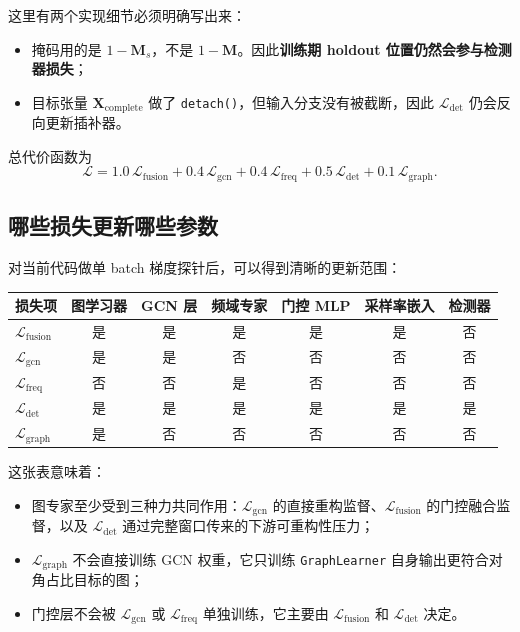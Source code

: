 \documentclass[UTF8]{ctexart}
\begin{document}
这里有两个实现细节必须明确写出来：
\begin{itemize}
    \item 掩码用的是 \(1-\bm{M}_{s}\)，不是 \(1-\bm{M}\)。因此\textbf{训练期 holdout 位置仍然会参与检测器损失}；
    \item 目标张量 \(\bm{X}_{\text{complete}}\) 做了 \texttt{detach()}，但输入分支没有被截断，因此 \(\mathcal{L}_{\text{det}}\) 仍会反向更新插补器。
\end{itemize}

总代价函数为
\begin{equation}
    \mathcal{L}
    =
    1.0\,\mathcal{L}_{\text{fusion}}
    + 0.4\,\mathcal{L}_{\text{gcn}}
    + 0.4\,\mathcal{L}_{\text{freq}}
    + 0.5\,\mathcal{L}_{\text{det}}
    + 0.1\,\mathcal{L}_{\text{graph}}.
\end{equation}

\subsection{哪些损失更新哪些参数}

对当前代码做单 batch 梯度探针后，可以得到清晰的更新范围：

\begin{center}
\small
\begin{tabular}{lcccccc}
\toprule
损失项 & 图学习器 & GCN 层 & 频域专家 & 门控 MLP & 采样率嵌入 & 检测器 \\
\midrule
\(\mathcal{L}_{\text{fusion}}\) & 是 & 是 & 是 & 是 & 是 & 否 \\
\(\mathcal{L}_{\text{gcn}}\) & 是 & 是 & 否 & 否 & 否 & 否 \\
\(\mathcal{L}_{\text{freq}}\) & 否 & 否 & 是 & 否 & 否 & 否 \\
\(\mathcal{L}_{\text{det}}\) & 是 & 是 & 是 & 是 & 是 & 是 \\
\(\mathcal{L}_{\text{graph}}\) & 是 & 否 & 否 & 否 & 否 & 否 \\
\bottomrule
\end{tabular}
\end{center}

这张表意味着：
\begin{itemize}
    \item 图专家至少受到三种力共同作用：\(\mathcal{L}_{\text{gcn}}\) 的直接重构监督、\(\mathcal{L}_{\text{fusion}}\) 的门控融合监督，以及 \(\mathcal{L}_{\text{det}}\) 通过完整窗口传来的下游可重构性压力；
    \item \(\mathcal{L}_{\text{graph}}\) 不会直接训练 GCN 权重，它只训练 \texttt{GraphLearner} 自身输出更符合对角占比目标的图；
    \item 门控层不会被 \(\mathcal{L}_{\text{gcn}}\) 或 \(\mathcal{L}_{\text{freq}}\) 单独训练，它主要由 \(\mathcal{L}_{\text{fusion}}\) 和 \(\mathcal{L}_{\text{det}}\) 决定。
\end{itemize}
\end{document}
